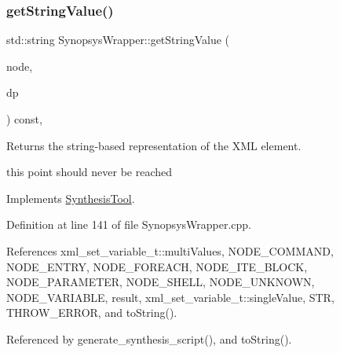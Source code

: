 \subsubsection{\texorpdfstring{get\+String\+Value()}{getStringValue()}}
{\footnotesize\ttfamily std\+::string Synopsys\+Wrapper\+::get\+String\+Value (\begin{DoxyParamCaption}\item[{const \hyperlink{xml__script__command_8hpp_a1fe3d50ade66bc35e41be9b68bbbcd02}{xml\+\_\+script\+\_\+node\+\_\+t\+Ref}}]{node,  }\item[{const \hyperlink{DesignParameters_8hpp_ae36bb1c4c9150d0eeecfe1f96f42d157}{Design\+Parameters\+Ref} \&}]{dp }\end{DoxyParamCaption}) const\hspace{0.3cm}{\ttfamily [override]}, {\ttfamily [virtual]}}



Returns the string-\/based representation of the X\+ML element. 

this point should never be reached 

Implements \hyperlink{classSynthesisTool_a730699a51a36280c89b32f324dedc1a7}{Synthesis\+Tool}.



Definition at line 141 of file Synopsys\+Wrapper.\+cpp.



References xml\+\_\+set\+\_\+variable\+\_\+t\+::multi\+Values, N\+O\+D\+E\+\_\+\+C\+O\+M\+M\+A\+ND, N\+O\+D\+E\+\_\+\+E\+N\+T\+RY, N\+O\+D\+E\+\_\+\+F\+O\+R\+E\+A\+CH, N\+O\+D\+E\+\_\+\+I\+T\+E\+\_\+\+B\+L\+O\+CK, N\+O\+D\+E\+\_\+\+P\+A\+R\+A\+M\+E\+T\+ER, N\+O\+D\+E\+\_\+\+S\+H\+E\+LL, N\+O\+D\+E\+\_\+\+U\+N\+K\+N\+O\+WN, N\+O\+D\+E\+\_\+\+V\+A\+R\+I\+A\+B\+LE, result, xml\+\_\+set\+\_\+variable\+\_\+t\+::single\+Value, S\+TR, T\+H\+R\+O\+W\+\_\+\+E\+R\+R\+OR, and to\+String().



Referenced by generate\+\_\+synthesis\+\_\+script(), and to\+String().

